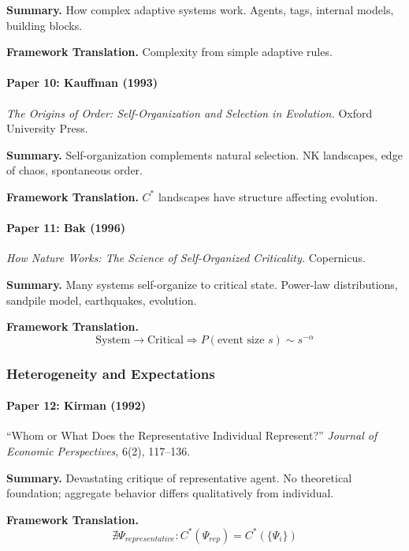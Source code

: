\textbf{Summary.}
How complex adaptive systems work. Agents, tags, internal models, 
building blocks.

\textbf{Framework Translation.}
Complexity from simple adaptive rules.

\paragraph{Paper 10: Kauffman (1993)}

\textit{The Origins of Order: Self-Organization and Selection in Evolution.}
Oxford University Press.

\textbf{Summary.}
Self-organization complements natural selection. NK landscapes, 
edge of chaos, spontaneous order.

\textbf{Framework Translation.}
$C^*$ landscapes have structure affecting evolution.

\paragraph{Paper 11: Bak (1996)}

\textit{How Nature Works: The Science of Self-Organized Criticality.}
Copernicus.

\textbf{Summary.}
Many systems self-organize to critical state. Power-law distributions, 
sandpile model, earthquakes, evolution.

\textbf{Framework Translation.}
\begin{equation}
\text{System} \to \text{Critical} \Rightarrow P(\text{event size } s) \sim s^{-\alpha}
\end{equation}

\subsubsection{Heterogeneity and Expectations}

\paragraph{Paper 12: Kirman (1992)}

``Whom or What Does the Representative Individual Represent?''
\textit{Journal of Economic Perspectives}, 6(2), 117--136.

\textbf{Summary.}
Devastating critique of representative agent. No theoretical foundation; 
aggregate behavior differs qualitatively from individual.

\textbf{Framework Translation.}
\begin{equation}
\nexists \Psi_{representative}: C^*(\Psi_{rep}) = C^*(\{\Psi_i\})
\end{equation}

